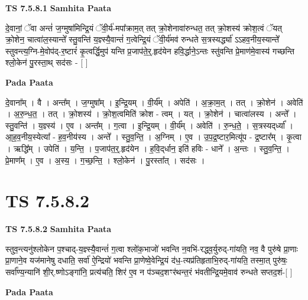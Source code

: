 \documentclass[17pt]{extarticle}
\begin{document}
\textbf{TS 7.5.8.1 } \newline
\textbf{Samhita Paata} \newline

दे॒वानां॒ ॅवा अन्तं॑ ज॒ग्मुषा॑मिन्द्रि॒यं ॅवी॒र्य॑-मपा᳚क्राम॒त् तत् क्रो॒शेनावा॑रुन्धत॒ तत् क्रो॒शस्य॑ क्रोश॒त्वं ॅयत् क्रो॒शेन॒ चात्वा॑ल॒स्यान्ते᳚ स्तु॒वन्ति॑ य॒ज्ञ्स्यै॒वान्तं॑ ग॒त्वेन्द्रि॒यं ॅवी॒र्य॑मव॑ रुन्धते स॒त्रस्यर्द्ध्या॑ ऽऽहव॒नीय॒स्यान्ते᳚ स्तुवन्त्य॒ग्नि-मे॒वोप॑द्-र॒ष्टारं॑ कृ॒त्वर्द्धि॒मुप॑ यन्ति प्र॒जाप॑ते॒र्॒.हृद॑येन हवि॒र्द्धाने॒ऽन्तः स्तु॑वन्ति प्रे॒माण॑मे॒वास्य॑ गच्छन्ति श्लो॒केन॑ पु॒रस्ता॒थ् सद॑सः - [  ] \newline

\textbf{Pada Paata} \newline

दे॒वाना᳚म् । वै । अन्त᳚म् । ज॒ग्मुषा᳚म् । इ॒न्द्रि॒यम् । वी॒र्य᳚म् । अपेति॑ । अ॒क्रा॒म॒त् । तत् । क्रो॒शेन॑ । अवेति॑ । अ॒रु॒न्ध॒त॒ । तत् । क्रो॒शस्य॑ । क्रो॒श॒त्वमिति॑ क्रोश - त्वम् । यत् । क्रो॒शेन॑ । चात्वा॑लस्य । अन्ते᳚ । स्तु॒वन्ति॑ । य॒ज्ञ्स्य॑ । ए॒व । अन्त᳚म् । ग॒त्वा । इ॒न्द्रि॒यम् । वी॒र्य᳚म् । अवेति॑ । रु॒न्ध॒ते॒ । स॒त्रस्यद्‌र्ध्या᳚ । आ॒ह॒व॒नीय॒स्येत्या᳚ - ह॒व॒नीय॑स्य । अन्ते᳚ । स्तु॒व॒न्ति॒ । अ॒ग्निम् । ए॒व । उ॒प॒द्र॒ष्टार॒मित्यू॑प - द्र॒ष्टार᳚म् । कृ॒त्वा । ऋद्धि᳚म् । उपेति॑ । य॒न्ति॒ । प॒जाप॑त॒र्॒.हृद॑येन । ह॒वि॒द्‌र्धान॒ इति॑ हविः - धाने᳚ । अ॒न्तः । स्तु॒व॒न्ति॒ । प्रे॒माण᳚म् । ए॒व । अ॒स्य॒ । ग॒च्छ॒न्ति॒ । श्लो॒केन॑ । पु॒रस्ता᳚त् । सद॑सः ।  \newline




\section*{ TS 7.5.8.2 }

\textbf{TS 7.5.8.2 } \newline
\textbf{Samhita Paata} \newline

स्तुव॒न्त्यनु॑श्लोकेन प॒श्चाद्-य॒ज्ञ्स्यै॒वान्तं॑ ग॒त्वा श्लो॑क॒भाजो॑ भवन्ति न॒वभि॑-रद्ध्व॒र्युरुद्-गा॑यति॒ नव॒ वै पुरु॑षे प्रा॒णाः प्रा॒णाने॒व यज॑मानेषु दधाति॒ सर्वा॑ ऐ॒न्द्रियो॑ भवन्ति प्रा॒णेष्वे॒वेन्द्रि॒यं द॑ध॒-त्यप्र॑तिहृताभि॒रुद्-गा॑यति॒ तस्मा॒त् पुरु॑षः॒ सर्वा᳚ण्य॒न्यानि॑ शी॒र्.ष्णोऽङ्गा॑नि॒ प्रत्य॑चति॒ शिर॑ ए॒व न प॑ञ्चद॒शꣳर॑थन्त॒रं भ॑वतीन्द्रि॒यमे॒वाव॑ रुन्धते सप्तद॒शं-[  ] \newline

\textbf{Pada Paata} \newline
\end{document}
